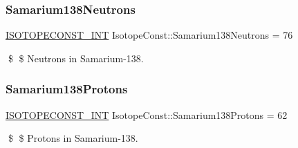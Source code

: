 \subsubsection{\texorpdfstring{Samarium138\+Neutrons}{Samarium138Neutrons}}
{\footnotesize\ttfamily \mbox{\hyperlink{group___isotope_const-_macros_ga5f18360b3e99483a35c32d789e62621c}{I\+S\+O\+T\+O\+P\+E\+C\+O\+N\+S\+T\+\_\+\+I\+NT}} Isotope\+Const\+::\+Samarium138\+Neutrons = 76}

\$ \$ Neutrons in Samarium-\/138. \mbox{\label{group___isotope_const-_samarium-_sm138_gab804907a03edec77d61612ccc0fc2e40}} 
\subsubsection{\texorpdfstring{Samarium138\+Protons}{Samarium138Protons}}
{\footnotesize\ttfamily \mbox{\hyperlink{group___isotope_const-_macros_ga5f18360b3e99483a35c32d789e62621c}{I\+S\+O\+T\+O\+P\+E\+C\+O\+N\+S\+T\+\_\+\+I\+NT}} Isotope\+Const\+::\+Samarium138\+Protons = 62}

\$ \$ Protons in Samarium-\/138. 